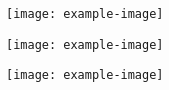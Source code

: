 \documentclass{beamer}
\begin{document}
\begin{frame}
    \parbox[c]{3cm}{\texttt{[image: example-image]}}
    \hspace*{0.75cm}%
    \parbox[c]{2cm}{\texttt{[image: example-image]}}
    \hspace*{0.75cm}%
    \parbox[c]{1cm}{\texttt{[image: example-image]}}
\end{frame} 
\end{document}
